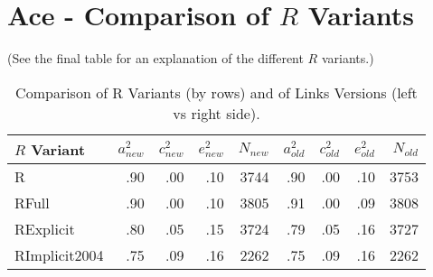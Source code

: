\documentclass{article}\usepackage{graphicx, color}
\begin{document}
\section{Ace - Comparison of $R$ Variants} 
(See the final table for an explanation of the different $R$ variants.)
\begin{table}[ht]
\centering
{\large
\begin{tabular}{l|rrrr|rrrr}
  \hline
$R$ Variant & $a_{new}^2$ & $c_{new}^2$ & $e_{new}^2$ & $N_{new}$ & $a_{old}^2$ & $c_{old}^2$ & $e_{old}^2$ & $N_{old}$ \\ 
  \hline
R & .90 & .00 & .10 & 3744 & .90 & .00 & .10 & 3753 \\ 
  RFull & .90 & .00 & .10 & 3805 & .91 & .00 & .09 & 3808 \\ 
  RExplicit & .80 & .05 & .15 & 3724 & .79 & .05 & .16 & 3727 \\ 
  RImplicit2004 & .75 & .09 & .16 & 2262 & .75 & .09 & .16 & 2262 \\ 
   \hline
\end{tabular}
}
\caption{Comparison of R Variants (by rows) and of Links Versions (left vs right side).} 
\end{table}
\end{document}
